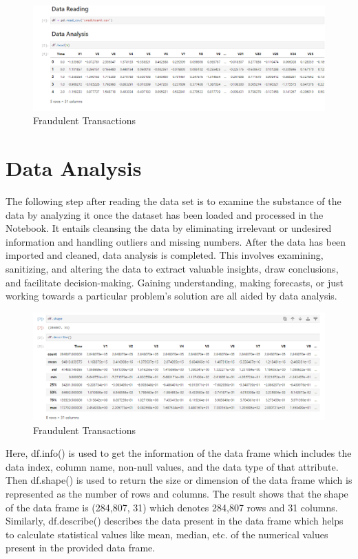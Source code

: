 \begin{figure}[ht]
    \centering
    \includegraphics[scale=1]{figures/Data Reading.png}
    \caption{Fraudulent Transactions}
    \label{fig:Data Preprocessing}
\end{figure}


\section{Data Analysis}
The following step after reading the data set is to examine the substance of the data by analyzing it once the dataset has been loaded and processed in the Notebook. It entails cleansing the data by eliminating irrelevant or undesired information and handling outliers and missing numbers. After the data has been imported and cleaned, data analysis is completed. This involves examining, sanitizing, and altering the data to extract valuable insights, draw conclusions, and facilitate decision-making. Gaining understanding, making forecasts, or just working towards a particular problem's solution are all aided by data analysis. 

\begin{figure}[ht]
    \centering
    \includegraphics[scale=1]{figures/Data Analysis.png}
    \caption{Fraudulent Transactions}
    \label{fig:Data Preprocessing}
\end{figure}
\clearpage
Here, df.info() is used to get the information of the data frame which includes the data index, column name, non-null values, and the data type of that attribute. Then df.shape() is used to return the size or dimension of the data frame which is represented as the number of rows and columns. The result shows that the shape of the data frame is (284,807, 31) which denotes 284,807 rows and 31 columns. Similarly, df.describe() describes the data present in the data frame which helps to calculate statistical values like mean, median, etc. of the numerical values present in the provided data frame.


